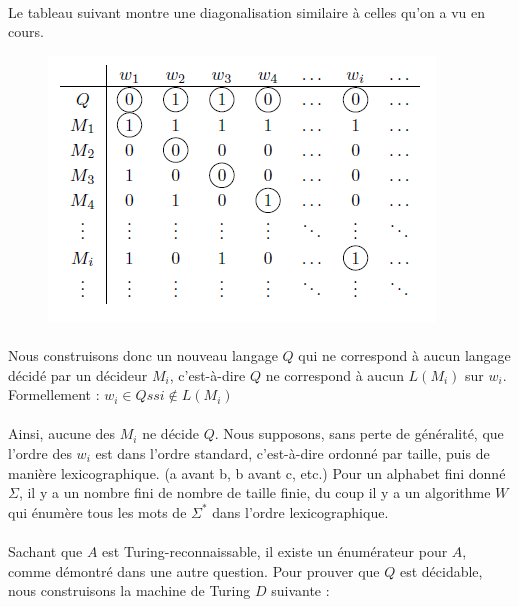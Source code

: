 \paragraph{}
Le tableau suivant montre une diagonalisation similaire à celles qu'on a vu en cours.

\begin{figure}[H]
   \centering
   \includegraphics{img_3_10__0}
\end{figure}

\paragraph{}
Nous construisons donc un nouveau langage $Q$ qui ne correspond à aucun langage décidé par un décideur $M_{i}$, c'est-à-dire $Q$ ne correspond à aucun $L(M_{i})$ sur $w_{i}$. Formellement : $w_{i} \in Q ssi \not\in L(M_{i})$

\paragraph{}
Ainsi, aucune des $M_{i}$ ne décide $Q$.
Nous supposons, sans perte de généralité, que l'ordre des $w_{i}$ est dans l'ordre standard, c'est-à-dire ordonné par taille, puis de manière lexicographique. (a avant b, b avant c, etc.) Pour un alphabet fini donné $\Sigma$, il y a un nombre fini de nombre de taille finie, du coup il y a un algorithme $W$ qui énumère tous les mots de $\Sigma^{*}$ dans l'ordre lexicographique. 

\paragraph{}
Sachant que $A$ est Turing-reconnaissable, il existe un énumérateur pour $A$, comme démontré dans une autre question. Pour prouver que $Q$ est décidable, nous construisons la machine de Turing $D$ suivante :


